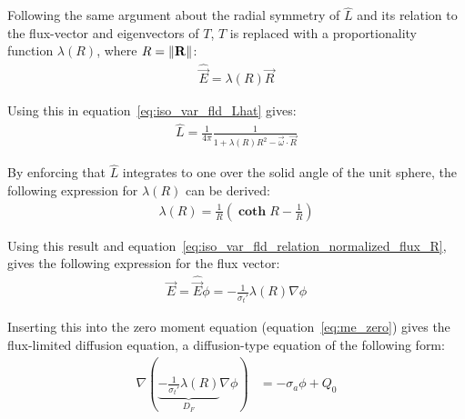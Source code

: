Following the same argument about the radial symmetry of $\hat{L}$ and its relation to the flux-vector and eigenvectors of $T$, $T$ is replaced with a proportionality function $\lambda(R)$, where $R=\left\lVert\boldsymbol{\mathbf{R}}\right\rVert$:
\begin{align}
\widehat{\vec{E}} = \lambda(R)\vec{R}
\label{eq:iso_var_fld_relation_normalized_flux_R}
\end{align}

Using this in equation~\ref{eq:iso_var_fld_Lhat} gives:
\begin{align}
\label{eq:iso_var_fld_Lhat_R}
\hat{L} = \frac{1}{4\pi}\frac{1}{1+\lambda(R)R^2-\vec{\omega}\cdot\vec{R}}
\end{align}

By enforcing that $\hat{L}$ integrates to one over the solid angle of the unit sphere, the following expression for $\lambda(R)$ can be derived:
\begin{align}
\label{eq:iso_var_fld_lambdaR}
\lambda(R) = \frac{1}{R}\left(\mathbf{\operatorname{coth}}R - \frac{1}{R}\right)
\end{align}

Using this result and equation~\ref{eq:iso_var_fld_relation_normalized_flux_R}, gives the following expression for the flux vector:
\begin{align}
\label{eq:iso_var_fld_fluxvector}
\vec{E} = \widehat{\vec{E}}\phi=-\frac{1}{\sigma_t'}\lambda(R)\nabla\phi
\end{align}

Inserting this into the zero moment equation (equation~\ref{eq:me_zero}) gives the flux-limited diffusion equation, a diffusion-type equation of the following form:
\begin{align}
\label{eq:iso_var_fld_final}
\nabla\left( \underbrace{-\frac{1}{\sigma_t'}\lambda(R)}_{D_F}\nabla\phi\right) &= -\sigma_a\phi + Q_0
\end{align}

